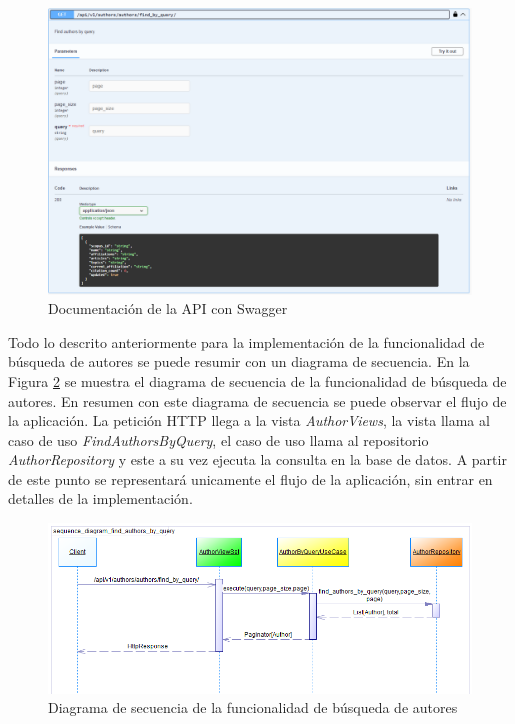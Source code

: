 \begin{figure}[H]
    \centering
    \includegraphics[scale=0.5]{../02Figures/02Chapter/Sprints/Sprint-3/swagger-ui.png}
    \caption{Documentación de la API con Swagger}
    \label{fig:swagger}
\end{figure}

Todo lo descrito anteriormente para la implementación de la funcionalidad de búsqueda de autores se puede resumir con un diagrama de secuencia.
En la Figura \ref{fig:sequence-diagram-authors-by-query} se muestra el diagrama de secuencia de la funcionalidad de búsqueda de autores.
En resumen con este diagrama de secuencia se puede observar el flujo de la aplicación. La petición HTTP llega a la vista \textit{AuthorViews}, la vista llama al caso de uso \textit{FindAuthorsByQuery}, el caso de uso llama al repositorio \textit{AuthorRepository} y este a su vez ejecuta la consulta en la base de datos.
A partir de este punto se representará unicamente el flujo de la aplicación, sin entrar en detalles de la implementación.
\begin{figure}[H]
    \centering
    \includegraphics[scale=0.9]{../02Figures/02Chapter/Sprints/Sprint-4/sequence_diagram_find_authors_by_query.png}
    \caption{Diagrama de secuencia de la funcionalidad de búsqueda de autores}
    \label{fig:sequence-diagram-authors-by-query}
    
\end{figure}


